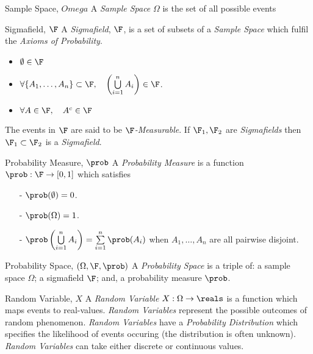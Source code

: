 \documentclass[11pt,a4paper]{article}
\begin{document}
\begin{definition}{Sample Space, $Omega$}
A \textit{Sample Space} $\Omega$ is the set of all possible events
\end{definition}

\begin{definition}{Sigmafield, $\F$}
A \textit{Sigmafield}, $\F$, is a set of subsets of a \textit{Sample Space} which fulfil the \textit{Axioms of Probability}.
\begin{itemize}
  \item $\emptyset\in\F$
  \item $\forall \{A_1,\dots,A_n\}\subset\F,\quad \left(\bigcup\limits_{i=1}^nA_i\right)\in\F$.
  \item $\forall A\in\F,\quad A^c\in\F$
\end{itemize}
The events in $\F$ are said to be \textit{$\F$-Measurable}. If $\F_1,\F_2$ are \textit{Sigmafields} then $\F_1\subset\F_2$ is a \textit{Sigmafield}.
\end{definition}

\begin{definition}{Probability Measure, $\prob$}
A \textit{Probability Measure} is a function $\prob:\F\to[0,1]$ which satisfies
\begin{itemize}
  \item[-] $\prob(\emptyset)=0$.
  \item[-] $\prob(\Omega)=1$.
  \item[-] $\prob\left(\bigcup\limits_{i=1}^nA_i\right)=\sum\limits_{i=1}^n\prob(A_i)$ when $A_1,\dots,A_n$ are all pairwise disjoint.
\end{itemize}
\end{definition}

\begin{definition}{Probability Space, $(\Omega,\F,\prob)$}
A \textit{Probability Space} is a triple of: a sample space $\Omega$; a sigmafield $\F$; and, a probability measure $\prob$.
\end{definition}

\begin{definition}{Random Variable, $X$}
A \textit{Random Variable} $X:\Omega\to\reals$ is a function which maps events to real-values. \textit{Random Variables} represent the possible outcomes of random phenomenon. \textit{Random Variables} have a \textit{Probability Distribution} which specifies the likelihood of events occuring (the distribution is often unknown). \textit{Random Variables} can take either discrete or continuous values.
\end{definition}
\end{document}
